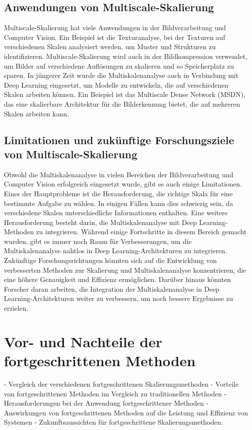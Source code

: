     \subsection{Anwendungen von Multiscale-Skalierung}
        Multiscale-Skalierung hat viele Anwendungen in der Bildverarbeitung und Computer Vision. Ein Beispiel ist die Texturanalyse, bei der Texturen auf verschiedenen Skalen analysiert werden, um Muster und Strukturen zu identifizieren. Multiscale-Skalierung wird auch in der Bildkompression verwendet, um Bilder auf verschiedene Auflösungen zu skalieren und so Speicherplatz zu sparen.
        In jüngerer Zeit wurde die Multiskalenanalyse auch in Verbindung mit Deep Learning eingesetzt, um Modelle zu entwickeln, die auf verschiedenen Skalen arbeiten können. Ein Beispiel ist das Multiscale Dense Network (MSDN), das eine skalierbare Architektur für die Bilderkennung bietet, die auf mehreren Skalen arbeiten kann.
    
    \subsection{Limitationen und zukünftige Forschungsziele von Multiscale-Skalierung}
        Obwohl die Multiskalenanalyse in vielen Bereichen der Bildverarbeitung und Computer Vision erfolgreich eingesetzt wurde, gibt es auch einige Limitationen. Eines der Hauptprobleme ist die Herausforderung, die richtige Skala für eine bestimmte Aufgabe zu wählen. In einigen Fällen kann dies schwierig sein, da verschiedene Skalen unterschiedliche Informationen enthalten.
        Eine weitere Herausforderung besteht darin, die Multiskalenanalyse mit Deep Learning-Methoden zu integrieren. Während einige Fortschritte in diesem Bereich gemacht wurden, gibt es immer noch Raum für Verbesserungen, um die Multiskalenanalyse nahtlos in Deep Learning-Architekturen zu integrieren.
        Zukünftige Forschungsrichtungen könnten sich auf die Entwicklung von verbesserten Methoden zur Skalierung und Multiskalenanalyse konzentrieren, die eine höhere Genauigkeit und Effizienz ermöglichen. Darüber hinaus könnten Forscher daran arbeiten, die Integration der Multiskalenanalyse in Deep Learning-Architekturen weiter zu verbessern, um noch bessere Ergebnisse zu erzielen.

\section{Vor- und Nachteile der fortgeschrittenen Methoden}

- Vergleich der verschiedenen fortgeschrittenen Skalierungsmethoden
- Vorteile von fortgeschrittenen Methoden im Vergleich zu traditionellen Methoden
- Herausforderungen bei der Anwendung fortgeschrittener Methoden
- Auswirkungen von fortgeschrittenen Methoden auf die Leistung und Effizienz von Systemen
- Zukunftsaussichten für fortgeschrittene Skalierungsmethoden.

\newpage
